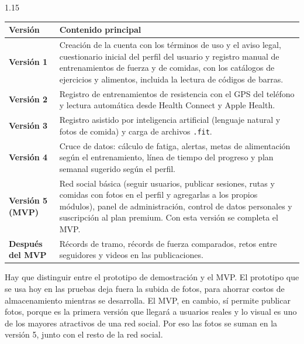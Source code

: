 \begin{spacing}{1.15}
\begin{center}
    \renewcommand{\arraystretch}{1.4}
    \begin{tabular}{|>{\raggedright\arraybackslash}m{3.0cm}|m{11.9cm}|}
        \hline
        \rowcolor[HTML]{EFEFEF}
        \textbf{Versión} & \textbf{Contenido principal} \\ \hline
        \textbf{Versión 1} & Creación de la cuenta con los términos de uso y el aviso legal, cuestionario inicial del perfil del usuario y registro manual de entrenamientos de fuerza y de comidas, con los catálogos de ejercicios y alimentos, incluida la lectura de códigos de barras. \\ \hline
        \textbf{Versión 2} & Registro de entrenamientos de resistencia con el GPS del teléfono y lectura automática desde Health Connect y Apple Health. \\ \hline
        \textbf{Versión 3} & Registro asistido por inteligencia artificial (lenguaje natural y fotos de comida) y carga de archivos \texttt{.fit}. \\ \hline
        \textbf{Versión 4} & Cruce de datos: cálculo de fatiga, alertas, metas de alimentación según el entrenamiento, línea de tiempo del progreso y plan semanal sugerido según el perfil. \\ \hline
        \rowcolor[HTML]{E8F5E9}
        \textbf{Versión 5 (MVP)} & Red social básica (seguir usuarios, publicar sesiones, rutas y comidas con fotos en el perfil y agregarlas a los propios módulos), panel de administración, control de datos personales y suscripción al plan premium. Con esta versión se completa el MVP. \\ \hline
        \textbf{Después del MVP} & Récords de tramo, récords de fuerza comparados, retos entre seguidores y videos en las publicaciones. \\ \hline
    \end{tabular}
    \label{tab:versiones_prototipo}
\end{center}

Hay que distinguir entre el prototipo de demostración y el MVP. El prototipo que se usa hoy en las pruebas deja fuera la subida de fotos, para ahorrar costos de almacenamiento mientras se desarrolla. El MVP, en cambio, sí permite publicar fotos, porque es la primera versión que llegará a usuarios reales y lo visual es uno de los mayores atractivos de una red social. Por eso las fotos se suman en la versión 5, junto con el resto de la red social.


\end{spacing}
